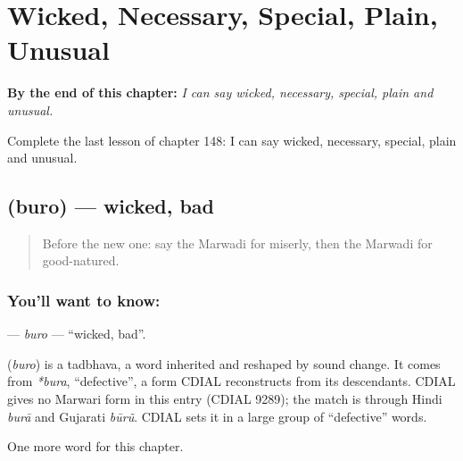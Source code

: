 
\chapter{Wicked, Necessary, Special, Plain, Unusual}
\label{ch:mw-wicked-necessary-special-plain-unusual}

\begin{chapteropening}
\textbf{By the end of this chapter:} \emph{I can say wicked, necessary, special, plain and unusual.}

Complete the last lesson of chapter 148: I can say wicked, necessary, special, plain and unusual.
\end{chapteropening}

\section[\texorpdfstring{\mw{बुरो} (buro)}{बुरो (buro)}]{ (buro) — wicked, bad}

\label{lesson:MW-C148-buro}



\begin{quote}
Before the new one: say the Marwadi for miserly, then the Marwadi for good-natured.
\end{quote}

\subsection*{You'll want to know: }
\textbf{} — \emph{buro} — \textquotedblleft{}wicked, bad\textquotedblright{}.

\begin{cousinweb}
\textbf{} (\emph{buro}) is a tadbhava, a word inherited and reshaped by sound change. It comes from \emph{*bura}, \textquotedblleft{}defective\textquotedblright{}, a form CDIAL reconstructs from its descendants. CDIAL gives no Marwari form in this entry (CDIAL 9289); the match is through Hindi \emph{burā} and Gujarati \emph{būrũ}. CDIAL sets it in a large group of \textquotedblleft{}defective\textquotedblright{} words.
\end{cousinweb}

\begin{grammarlens}[title={What you've built}]
One more word for this chapter.
\end{grammarlens}

